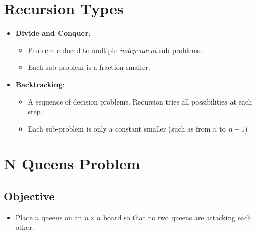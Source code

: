 
\section{Recursion Types}

\begin{itemize}
    \item \textbf{Divide and Conquer}:
    \begin{itemize}
        \item Problem reduced to multiple \textit{independent} sub-problems.
        \item Each sub-problem is a fraction smaller.
    \end{itemize}
    \item \textbf{Backtracking}:
    \begin{itemize}
        \item A sequence of decision problems. Recursion tries all possibilities at each step.
        \item Each sub-problem is only a constant smaller (such as from $n$ to $n - 1$)
    \end{itemize}
\end{itemize}

\section{N Queens Problem}

\subsection{Objective}
\begin{itemize}
    \item Place $n$ queens on an $n \times n$ board so that no two queens are attacking each other.
\end{itemize}

